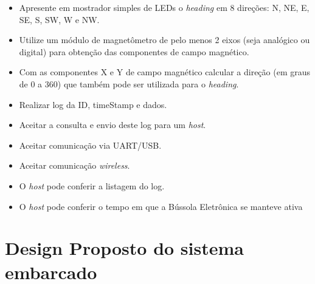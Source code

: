 \documentclass[10pt,twocolumn,letterpaper]{article}
\begin{document}
\begin{itemize}
    \item Apresente em mostrador simples de LEDs o \emph{heading} em 8 direções: N, NE, E, SE, S, SW, W e NW.
    \item Utilize um módulo de magnetômetro de pelo menos 2 eixos (seja analógico ou digital) para obtenção 
    das componentes de campo magnético.
    \item Com as componentes X e Y de campo magnético calcular a direção (em graus de 0 a 360) que também 
    pode ser utilizada para o \emph{heading}.
    \item Realizar log da ID, timeStamp e dados.
    \item Aceitar a consulta e envio deste log para um \emph{host}.
    \item Aceitar comunicação via UART/USB.
    \item Aceitar comunicação \emph{wireless}.
    \item O \emph{host} pode conferir a listagem do log.
    \item O \emph{host} pode conferir o tempo em que a Bússola Eletrônica se manteve ativa 
\end{itemize}


\section{Design Proposto do sistema embarcado}
\end{document}
